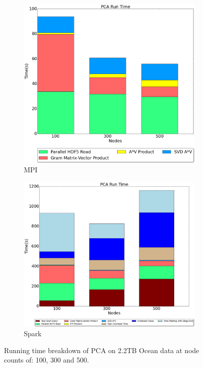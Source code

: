 \begin{figure}[th!]
\centering
\begin{subfigure}{.35\textwidth}
\includegraphics[width=\textwidth]{fig/mpi_pca.png}
\caption{MPI}
\label{fig:mpipca}
\end{subfigure}
\begin{subfigure}{.4\textwidth}
\includegraphics[width=\textwidth]{fig/spark_pca.png}
\caption{Spark}
\label{fig:sparkpca}
\end{subfigure}
\caption{Running time breakdown of PCA on 2.2TB Ocean data at node counts of: 100, 300 and 500.}
\label{fig:pcart}
\end{figure}

